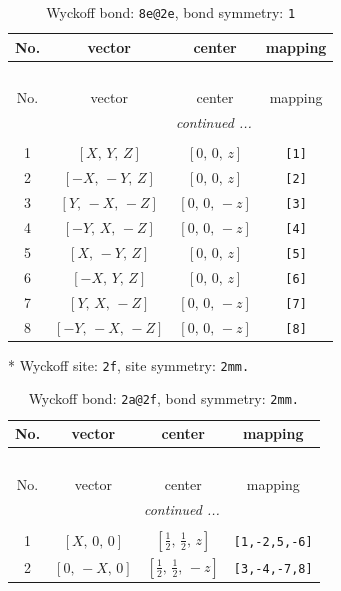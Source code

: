 \documentclass[fleqn,8pt]{jsarticle}
\begin{document}
\begin{longtable}{cccc}
\caption{Wyckoff bond: {\tt 8e@2e}, bond symmetry: {\tt 1}}
 \\
 \hline \hline
No. & vector & center & mapping \\ \hline \endfirsthead

\multicolumn{3}{l}{\tablename\ \thetable{}} \\
 \hline \hline
No. & vector & center & mapping \\ \hline \endhead

 \hline \hline
\multicolumn{3}{r}{\footnotesize\it continued ...} \\ \endfoot

 \hline \hline
\multicolumn{3}{r}{} \\ \endlastfoot

1 & $\left[ X,\, Y,\, Z \right]$ & $\left[ 0,\, 0,\, z \right]$ & {\tt [1]} \\ \hline
2 & $\left[ - X,\, - Y,\, Z \right]$ & $\left[ 0,\, 0,\, z \right]$ & {\tt [2]} \\ \hline
3 & $\left[ Y,\, - X,\, - Z \right]$ & $\left[ 0,\, 0,\, - z \right]$ & {\tt [3]} \\ \hline
4 & $\left[ - Y,\, X,\, - Z \right]$ & $\left[ 0,\, 0,\, - z \right]$ & {\tt [4]} \\ \hline
5 & $\left[ X,\, - Y,\, Z \right]$ & $\left[ 0,\, 0,\, z \right]$ & {\tt [5]} \\ \hline
6 & $\left[ - X,\, Y,\, Z \right]$ & $\left[ 0,\, 0,\, z \right]$ & {\tt [6]} \\ \hline
7 & $\left[ Y,\, X,\, - Z \right]$ & $\left[ 0,\, 0,\, - z \right]$ & {\tt [7]} \\ \hline
8 & $\left[ - Y,\, - X,\, - Z \right]$ & $\left[ 0,\, 0,\, - z \right]$ & {\tt [8]} \\
\end{longtable}
* Wyckoff site: {\tt 2f}, site symmetry: {\tt 2mm.}
\renewcommand{\arraystretch}{1.2}
\begin{longtable}{cccc}
\caption{Wyckoff bond: {\tt 2a@2f}, bond symmetry: {\tt 2mm.}}
 \\
 \hline \hline
No. & vector & center & mapping \\ \hline \endfirsthead

\multicolumn{3}{l}{\tablename\ \thetable{}} \\
 \hline \hline
No. & vector & center & mapping \\ \hline \endhead

 \hline \hline
\multicolumn{3}{r}{\footnotesize\it continued ...} \\ \endfoot

 \hline \hline
\multicolumn{3}{r}{} \\ \endlastfoot

1 & $\left[ X,\, 0,\, 0 \right]$ & $\left[ \frac{1}{2},\, \frac{1}{2},\, z \right]$ & {\tt [1,-2,5,-6]} \\ \hline
2 & $\left[ 0,\, - X,\, 0 \right]$ & $\left[ \frac{1}{2},\, \frac{1}{2},\, - z \right]$ & {\tt [3,-4,-7,8]} \\
\end{longtable}
\end{document}
